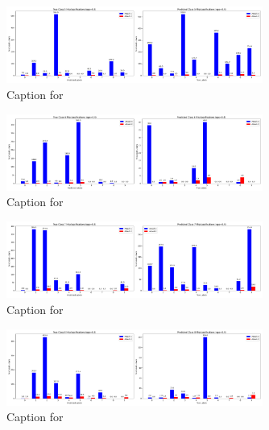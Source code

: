 \documentclass{article}
\begin{document}
\begin{figure}[!htbp]
\centering
\includegraphics[width=0.75\textwidth]{combined_class_boundary_pgd/combined_class_5_misclassifications_eps_0.4.png}
\caption{Caption for }
\label{fig:combined_class_5_misclassifications_eps_0.4.png}
\end{figure}

\begin{figure}[!htbp]
\centering
\includegraphics[width=0.75\textwidth]{combined_class_boundary_pgd/combined_class_6_misclassifications_eps_0.4.png}
\caption{Caption for }
\label{fig:combined_class_6_misclassifications_eps_0.4.png}
\end{figure}


\begin{figure}[!htbp]
\centering
\includegraphics[width=0.75\textwidth]{combined_class_boundary_pgd/combined_class_7_misclassifications_eps_0.4.png}
\caption{Caption for }
\label{fig:combined_class_7_misclassifications_eps_0.4.png}
\end{figure}

\begin{figure}[!htbp]
\centering
\includegraphics[width=0.75\textwidth]{combined_class_boundary_pgd/combined_class_8_misclassifications_eps_0.4.png}
\caption{Caption for }
\label{fig:combined_class_8_misclassifications_eps_0.4.png}
\end{figure}
\end{document}
